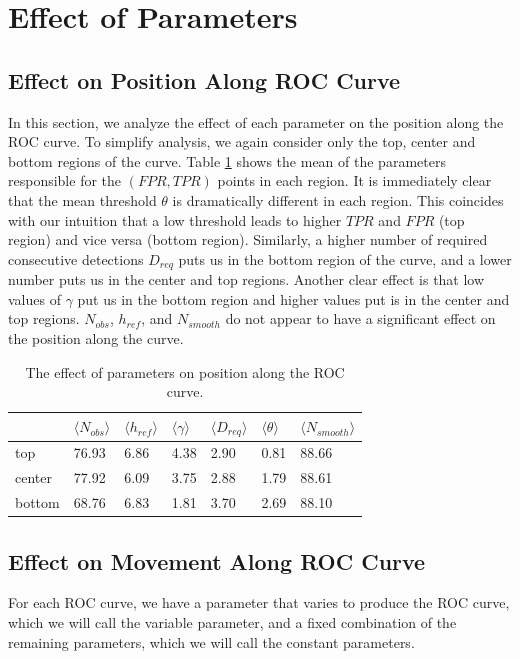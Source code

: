 \section{Effect of Parameters}
\label{sec:param_effect}
\subsection{Effect on Position Along ROC Curve}
\clearpage
In this section, we analyze the effect of each parameter on the position along
the ROC curve. To simplify analysis, we again consider only the top, center and
bottom regions of the curve. Table \ref{tbl:roc_pos} shows the mean of the
parameters responsible for the $(FPR,TPR)$ points in each region. It is
immediately clear that the mean threshold $\theta$ is dramatically different in
each region. This coincides with our intuition that a low threshold leads to
higher $TPR$ and $FPR$ (top region) and vice versa (bottom region). Similarly, a
higher number of required consecutive detections $D_{req}$ puts us in the bottom
region of the curve, and a lower number puts us in the center and top
regions. Another clear effect is that low values of $\gamma$ put us in the
bottom region and higher values put is in the center and top regions. $N_{obs}$, $h_{ref}$, and $N_{smooth}$ do not appear to have a
significant effect on the position along the curve.
\begin{table}
\begin{center}
\begin{tabular}{|l|llllll|}
\hline
& $\langle N_{obs} \rangle$ & $\langle h_{ref} \rangle$ &$\langle \gamma
  \rangle$ & $\langle D_{req} \rangle$ & $\langle \theta \rangle$ & $\langle
  N_{smooth} \rangle$ \\\hline
top & 76.93 & 6.86 & 4.38 & 2.90 & 0.81 & 88.66\\
center & 77.92 & 6.09 & 3.75 & 2.88 & 1.79 & 88.61\\
bottom & 68.76 & 6.83 & 1.81 & 3.70 & 2.69 & 88.10\\
\hline
\end{tabular}
\end{center}
\caption{\label{tbl:roc_pos} The effect of parameters on position along the ROC curve.}
\end{table}

\clearpage
\subsection{Effect on Movement Along ROC Curve}
For each ROC curve, we have a parameter that varies to produce the ROC curve,
which we will call the variable parameter, and a fixed combination of the
remaining parameters, which we will call the constant parameters.

